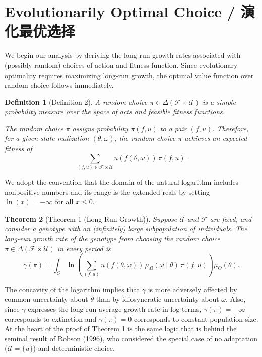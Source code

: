 \documentclass[12pt,a4paper]{article}
\newenvironment{original}
  {\par\noindent\color{black}\smallskip}
  {\par\smallskip}
\newtheorem{theorem}{Theorem}[section]
\newtheorem{definition}[theorem]{Definition}
\begin{document}
\newpage

\section{Evolutionarily Optimal Choice / 演化最优选择}

\begin{original}
We begin our analysis by deriving the long-run growth rates associated with (possibly random) choices of action and fitness function. Since evolutionary optimality requires maximizing long-run growth, the optimal value function over random choice follows immediately.

\begin{definition}[Definition 2]
A random choice $\pi \in \Delta(\mathcal{F} \times \mathcal{U})$ is a simple probability measure over the space of acts and feasible fitness functions.

The random choice $\pi$ assigns probability $\pi(f, u)$ to a pair $(f, u)$. Therefore, for a given state realization $(\theta, \omega)$, the random choice $\pi$ achieves an expected fitness of
\[
\sum_{(f,u) \in \mathcal{F} \times \mathcal{U}} u(f(\theta, \omega)) \, \pi(f, u).
\]
\end{definition}

We adopt the convention that the domain of the natural logarithm includes nonpositive numbers and its range is the extended reals by setting $\ln(x) = -\infty$ for all $x \leq 0$.

\begin{theorem}[Theorem 1 (Long-Run Growth)]
Suppose $\mathcal{U}$ and $\mathcal{F}$ are fixed, and consider a genotype with an (infinitely) large subpopulation of individuals. The long-run growth rate of the genotype from choosing the random choice $\pi \in \Delta(\mathcal{F} \times \mathcal{U})$ in every period is
\begin{equation}\label{eq:1}
\gamma(\pi) = \int_{\Theta} \ln\!\left( \sum_{(f,u)} u(f(\theta, \omega)) \, \mu_\Omega(\omega \mid \theta) \, \pi(f, u) \right) \mu_\Theta(\theta).
\end{equation}
\end{theorem}

The concavity of the logarithm implies that $\gamma$ is more adversely affected by common uncertainty about $\theta$ than by idiosyncratic uncertainty about $\omega$. Also, since $\gamma$ expresses the long-run average growth rate in log terms, $\gamma(\pi) = -\infty$ corresponds to extinction and $\gamma(\pi) = 0$ corresponds to constant population size. At the heart of the proof of Theorem 1 is the same logic that is behind the seminal result of Robson (1996), who considered the special case of no adaptation ($\mathcal{U} = \{u\}$) and deterministic choice.
\end{original}
\end{document}
